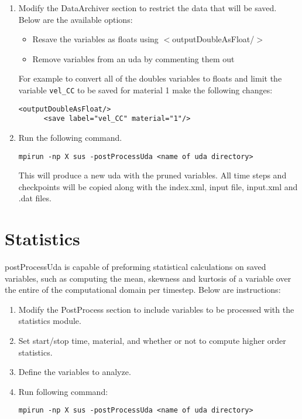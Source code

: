 \begin{enumerate}
\item Modify the DataArchiver section to restrict the data that will be saved.  Below are the available options:
%
   \begin{itemize}
     \item Resave the variables as floats using $<$outputDoubleAsFloat/$>$
     \item Remove variables from an uda by commenting them out
  \end{itemize}
%
For example to convert all of the doubles variables to floats and limit the variable \verb|vel_CC| to be saved for material 1 make the following changes:
%
  \begin{Verbatim}[fontsize=\footnotesize]
      <outputDoubleAsFloat/>
      <save label="vel_CC" material="1"/>
  \end{Verbatim}
%
\item Run the following command.
  \begin{Verbatim}[fontsize=\footnotesize]
      mpirun -np X sus -postProcessUda <name of uda directory>
  \end{Verbatim}
%  
This will produce a new uda with the pruned variables. All time steps and checkpoints will be copied along with the index.xml, input file, input.xml and .dat files.

\end{enumerate}


\section{Statistics}
postProcessUda is capable of preforming statistical calculations on saved variables, such as computing the mean, skewness and kurtosis of a variable over the entire of the computational domain per timestep. Below are instructions:

\begin{enumerate}
\item Modify the PostProcess section to include variables to be processed with the statistics module.
\item Set start/stop time, material, and whether or not to compute higher order statistics.
\item Define the variables to analyze.
\item Run  following command:
    \begin{Verbatim}[fontsize=\footnotesize]
      mpirun -np X sus -postProcessUda <name of uda directory>
    \end{Verbatim}
\end{enumerate}

